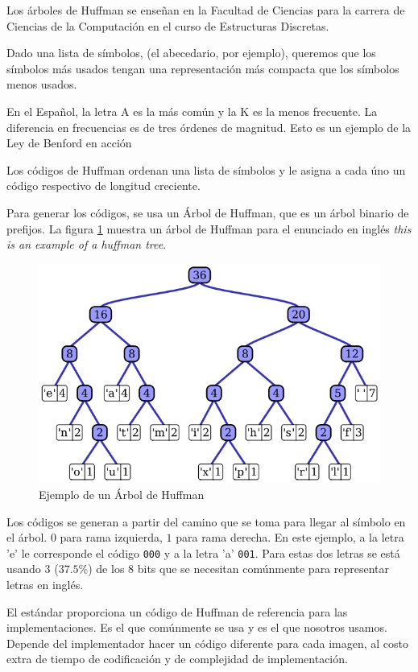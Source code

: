 Los árboles de Huffman se enseñan en la Facultad de Ciencias para la carrera de
Ciencias de la Computación en el curso de Estructuras Discretas.

Dado una lista de símbolos, (el abecedario, por ejemplo), queremos que los
símbolos más usados tengan una representación más compacta que los símbolos
menos usados.

En el Español, la letra A es la más común y la K es la menos frecuente.
\cite{Espanol} La diferencia en frecuencias es de tres órdenes de magnitud.
Esto es un ejemplo de la Ley de Benford en acción \cite{Benford}

Los códigos de Huffman ordenan una lista de símbolos y le asigna a cada úno un
código respectivo de longitud creciente.

Para generar los códigos, se usa un Árbol de Huffman, que es un árbol binario
de prefijos. La figura \ref{fig:huffman} muestra un árbol de Huffman para el
enunciado en inglés \emph{this is an example of a huffman tree}.

\begin{figure}[h]
    \includegraphics[width=1.0\textwidth]{Huffman}
    \caption{Ejemplo de un Árbol de Huffman}
    \label{fig:huffman}
\end{figure}

Los códigos se generan a partir del camino que se toma para llegar al símbolo
en el árbol. $0$ para rama izquierda, $1$ para rama derecha. En este ejemplo, a
la letra 'e' le corresponde el código \verb+000+ y a la letra 'a' \verb+001+.
Para estas dos letras se está usando 3 ($37.5\%$) de los 8 bits que se
necesitan comúnmente para representar letras en inglés.

El estándar proporciona un código de Huffman de referencia para las
implementaciones. Es el que comúnmente se usa y es el que nosotros usamos.
Depende del implementador hacer un código diferente para cada imagen, al costo
extra de tiempo de codificación y de complejidad de implementación.

